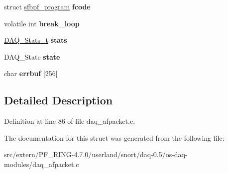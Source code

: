 \begin{DoxyCompactItemize}
\item 
\hypertarget{struct__afpacket__context_a3d53ff8346f0c2c43f1928db0b1d4399}{
struct \hyperlink{structsfbpf__program}{sfbpf\_\-program} {\bfseries fcode}}
\label{struct__afpacket__context_a3d53ff8346f0c2c43f1928db0b1d4399}

\item 
\hypertarget{struct__afpacket__context_a35e21074b2ab897d6435caf1dbcd6dd5}{
volatile int {\bfseries break\_\-loop}}
\label{struct__afpacket__context_a35e21074b2ab897d6435caf1dbcd6dd5}

\item 
\hypertarget{struct__afpacket__context_ab326c0b39d3004f470ea16b2a231f614}{
\hyperlink{struct__daq__stats}{DAQ\_\-Stats\_\-t} {\bfseries stats}}
\label{struct__afpacket__context_ab326c0b39d3004f470ea16b2a231f614}

\item 
\hypertarget{struct__afpacket__context_a82b45f5a6a184a21afe6b0918122bfe0}{
DAQ\_\-State {\bfseries state}}
\label{struct__afpacket__context_a82b45f5a6a184a21afe6b0918122bfe0}

\item 
\hypertarget{struct__afpacket__context_a74e11cc6d4b4e430c138c410da245e53}{
char {\bfseries errbuf} \mbox{[}256\mbox{]}}
\label{struct__afpacket__context_a74e11cc6d4b4e430c138c410da245e53}

\end{DoxyCompactItemize}


\subsection{Detailed Description}


Definition at line 86 of file daq\_\-afpacket.c.



The documentation for this struct was generated from the following file:\begin{DoxyCompactItemize}
\item 
src/extern/PF\_\-RING-\/4.7.0/userland/snort/daq-\/0.5/os-\/daq-\/modules/daq\_\-afpacket.c\end{DoxyCompactItemize}
